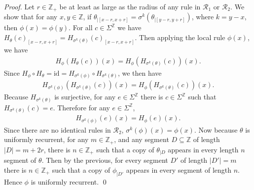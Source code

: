 \documentclass[runningheads]{llncs}
\newcommand{\Z}{\mathbb{Z}}
\newcommand{\R}{\mathcal{R}}
\newcommand{\id}{\mathrm{id}}
\begin{document}
\begin{proof} 
Let $r\in \Z_+$ be at least as large as the radius of any rule in $\R_1$ or $\R_2$. We show that for any $x,y \in \Z$, if $\theta_{|[x-r,x+r]} = \sigma^k (\theta_{|[y-r,y+r]})$, where $k=y-x$, then $\phi(x) = \phi(y)$. For all $c \in \Sigma^\Z$ we have $H_\theta (c)_{[x-r,x+r]} = H_{\sigma^k (\theta)} (c)_{[x-r,x+r]}$. Then applying the local rule $\phi(x)$, we have
\begin{align*}
H_\phi (H_\theta (c)) (x) = H_\phi (H_{\sigma^k (\theta)} (c)) (x).
\end{align*}
Since $H_\phi \circ H_\theta = \id = H_{\sigma^k (\phi)} \circ H_{\sigma^k (\theta)}$, we then have
\begin{align*}
H_{\sigma^k(\phi)} (H_{\sigma^k (\theta)} (c)) (x) = H_\phi (H_{\sigma^k (\theta)} (c)) (x).
\end{align*}
Because $H_{\sigma^k (\theta)}$ is surjective, for any $e \in \Sigma^\Z$ there is $c \in \Sigma^\Z$ such that $H_{\sigma^k (\theta)}(c) = e$. Therefore for any $e\in \Sigma^\Z$, 
\begin{align*}
H_{\sigma^k(\phi)} (e) (x) = H_\phi (e) (x).
\end{align*}
Since there are no identical rules in $\R_2$, $\sigma^k(\phi)(x) = \phi(x)$. Now because $\theta$ is uniformly recurrent, for any $m \in \Z_+$, and any segment $D \subseteq \Z$ of length $|D|=m+2r$, there is $n \in \Z_+$ such that  a copy of $\theta_{|D}$ appears in every length $n$ segment of $\theta$. Then by the previous, for every segment $D'$ of length $|D'|=m$ there is $n\in \Z_+$ such that a copy of $\phi_{|D'}$ appears in every segment of length $n$. Hence $\phi$ is uniformly recurrent.
\qed






\end{proof}
\end{document}

